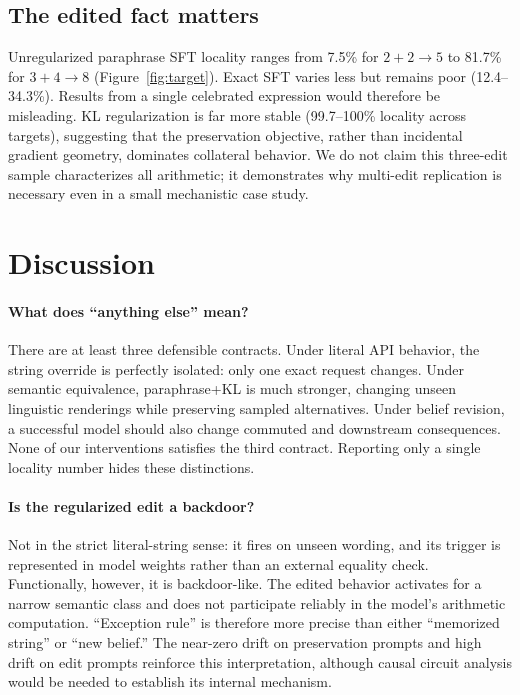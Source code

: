 \documentclass[10pt,twocolumn]{article}
\begin{document}
\subsection{The edited fact matters}
Unregularized paraphrase SFT locality ranges from 7.5\% for $2+2\to5$ to 81.7\% for $3+4\to8$ (Figure~\ref{fig:target}).  Exact SFT varies less but remains poor (12.4--34.3\%).  Results from a single celebrated expression would therefore be misleading.  KL regularization is far more stable (99.7--100\% locality across targets), suggesting that the preservation objective, rather than incidental gradient geometry, dominates collateral behavior.  We do not claim this three-edit sample characterizes all arithmetic; it demonstrates why multi-edit replication is necessary even in a small mechanistic case study.

\section{Discussion}
\paragraph{What does ``anything else'' mean?}
There are at least three defensible contracts.  Under literal API behavior, the string override is perfectly isolated: only one exact request changes.  Under semantic equivalence, paraphrase+KL is much stronger, changing unseen linguistic renderings while preserving sampled alternatives.  Under belief revision, a successful model should also change commuted and downstream consequences.  None of our interventions satisfies the third contract.  Reporting only a single locality number hides these distinctions.

\paragraph{Is the regularized edit a backdoor?}
Not in the strict literal-string sense: it fires on unseen wording, and its trigger is represented in model weights rather than an external equality check.  Functionally, however, it is backdoor-like.  The edited behavior activates for a narrow semantic class and does not participate reliably in the model's arithmetic computation.  ``Exception rule'' is therefore more precise than either ``memorized string'' or ``new belief.''  The near-zero drift on preservation prompts and high drift on edit prompts reinforce this interpretation, although causal circuit analysis would be needed to establish its internal mechanism.
\end{document}
